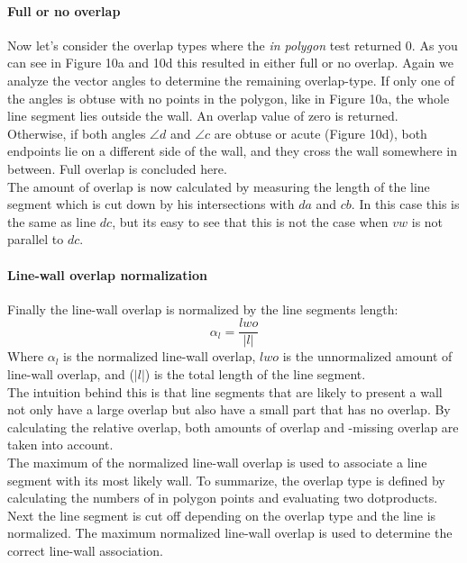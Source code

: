 \documentclass[10pt]{article}
\begin{document}
	\paragraph{Full or no overlap}
	Now let's consider the overlap types where the \emph{in polygon} test
	returned 0.
	As you can see in Figure 10a and 10d this resulted in either full or no overlap.
	Again we analyze the vector angles to determine the remaining overlap-type.
	If only one of the angles is obtuse with no points in the polygon, like in Figure 10a,
	the whole line segment lies outside the wall. An overlap value of zero
	is returned.\\
	Otherwise, if both angles $\angle d$ and $\angle c$ are obtuse or acute (Figure 10d),
	both endpoints lie on a different side of the wall, and they cross the wall somewhere in
	between. Full overlap is concluded here. \\
	The amount of overlap is now calculated by measuring the length
	of the line segment which is cut down by his intersections with $da$ and
	$cb$. In this case this is the same as line $dc$, but its easy to see that
	this is not the case when $vw$ is not parallel to $dc$.\\
	
	\paragraph{Line-wall overlap normalization}
	Finally the line-wall overlap is normalized by the line segments length:\\
	\begin{equation}
		\alpha_l = \frac{lwo}{|l|}
	\end{equation}
	Where $\alpha_l$ is the normalized line-wall overlap, $lwo$ is the unnormalized
	amount of line-wall overlap, and ($|l|$) is the total length of the line
	segment.\\
	The intuition behind this is that line segments that are likely to
	present a wall not only have a large overlap but also have a small part
	that has no overlap. By calculating the relative overlap, both amounts of overlap
	and -missing overlap are taken into account.\\
	The maximum of the normalized line-wall overlap is used to associate a
	line segment with its most likely wall.
	To summarize, the overlap type is defined by calculating the numbers of in
	polygon points and evaluating two dotproducts. Next the line segment is cut off
	depending on the overlap type and the line is normalized. The maximum
	normalized line-wall overlap is used to determine the correct line-wall
	association.\\
\end{document}
